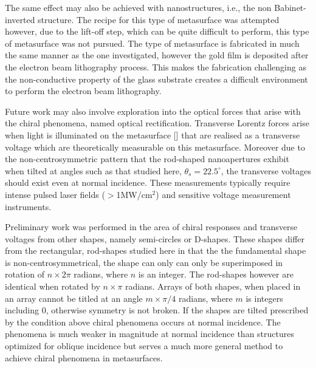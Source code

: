 The same effect may also be achieved with nanostructures, i.e., the non Babinet-inverted structure. The recipe for this type of metasurface was attempted however, due to the lift-off step, which can be quite difficult to perform, this type of metasurface was not pursued. The type of metasurface is fabricated in much the same manner as the one investigated, however the gold film is deposited after the electron beam lithography process. This makes the fabrication challenging as the non-conductive property of the glass substrate creates a difficult environment to perform the electron beam lithography.

Future work may also involve exploration into the optical forces that arise with the chiral phenomena, named optical rectification. Transverse Lorentz forces arise when light is illuminated on the metasurface [\cite{Proscia}] that are realised as a transverse voltage which are theoretically measurable on this metasurface. Moreover due to the non-centrosymmetric pattern that the rod-shaped nanoapertures exhibit when tilted at angles such as that studied here, $\theta_s=22.5^\circ$, the transverse voltages should exist even at normal incidence. These measurements typically require intense pulsed laser fields ($>$1MW/cm$^2$) and sensitive voltage measurement instruments.

Preliminary work was performed in the area of chiral responses and transverse voltages from other shapes, namely semi-circles or D-shapes. These shapes differ from the rectangular, rod-shapes studied here in that the the fundamental shape is non-centrosymmetrical, the shape can only can only be superimposed in rotation of $n\times 2\pi$ radians, where $n$ is an integer. The rod-shapes however are identical when rotated by $n\times \pi$ radians. Arrays of both shapes, when placed in an array cannot be titled at an angle $m\times \pi/4$ radians, where $m$ is integers including 0, otherwise symmetry is not broken. If the shapes are tilted prescribed by the condition above chiral phenomena occurs at normal incidence. The phenomena is much weaker in magnitude at normal incidence than structures optimized for oblique incidence but serves a much more general method to achieve chiral phenomena in metasurfaces. 